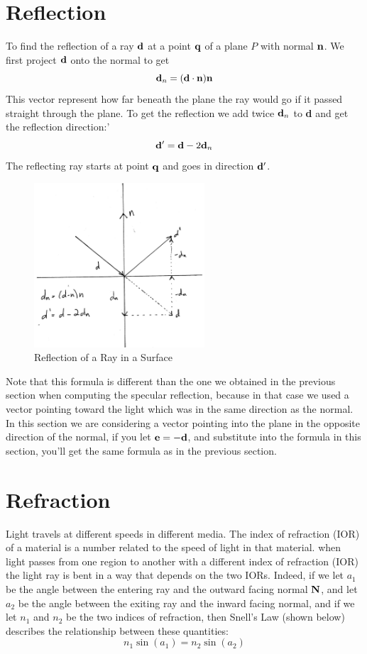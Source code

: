 \documentclass{book}
\newcommand{\vect}[1]{{\bf{ #1}}}
\begin{document}
\section{Reflection}
To find the reflection of a ray ${\vect d}$ at a point ${\vect q}$ of a plane $P$
with normal ${\vect n}$. We first project ${\vect d}$ onto the normal to get
\[
{\vect d}_n = ({\vect d}\cdot{\vect n}) {\vect n}
\]
This vector represent how far beneath the plane the ray would go if it passed straight
through the plane. To get the reflection we add twice ${\vect d}_n$ to {\vect d} and get
the reflection direction:'\
\[
{\vect d'} = {\vect d} - 2 {\vect d}_n
\]
The reflecting ray starts at point ${\vect q}$ and goes in direction ${\vect d'}$.
\begin{figure}[h]
\centering
\includegraphics[width=2.5in]{images/reflection2.jpg}
\caption{Reflection of a Ray in a Surface}
\end{figure}
Note that this formula is different than the one we obtained in the previous section
when computing the specular reflection, because in that case we used a vector pointing
toward the light which was in the same direction as the normal. In this section
we are considering a vector pointing into the plane in the opposite direction of
the normal, if you let $\vect{e} = -\vect{d}$, and substitute into the formula
in this section, you'll get the same formula as in the previous section.



\section{Refraction}
Light travels at different speeds in different media. The index of refraction (IOR) of a material
is a number related to the speed of light in that material.
when light passes from one region to another with a different index of refraction (IOR)
the light ray is bent in a way that depends on the two IORs. Indeed, if we let $a_1$ be
the angle between the entering ray and the outward facing normal $\vect{N}$, and let $a_2$ be the
angle between the exiting ray and the inward facing normal, and if we let $n_1$ and $n_2$ be
the two indices of refraction, then Snell's Law (shown below) describes the relationship
between these quantities:
\[
n_1 \sin(a_1) = n_2 \sin(a_2)
\]
\end{document}
